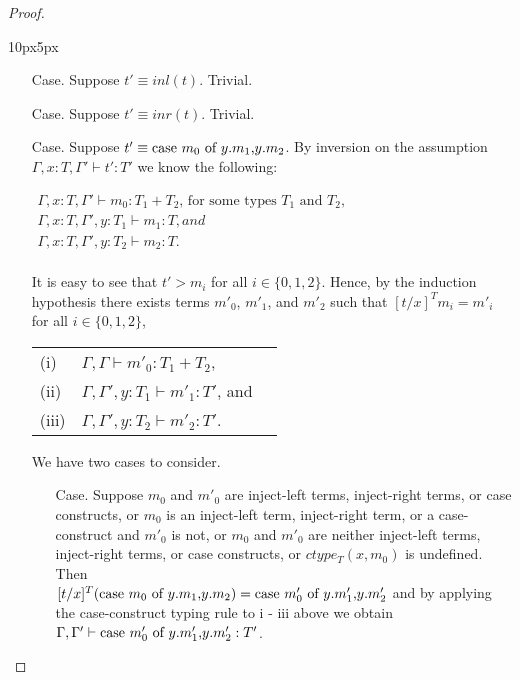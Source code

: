 \begin{proof}
\begin{changemargin}{10px}{5px}
\begin{itemize}
\item[Case.] Suppose $t' \equiv inl(t)$. Trivial.
  
\item[Case.] Suppose $t' \equiv inr(t)$. Trivial.
  
\item[Case.] Suppose $t' \equiv \mbox{case}\ m_0\ \text{of}\ y\text{.}m_1\text{,}y\text{.}m_2$. By inversion on the assumption
  $\Gamma,x:T,\Gamma' \vdash t':T'$ we know the following:
  \begin{center}
    \begin{math}
      \begin{array}{lll}
        \Gamma,x:T,\Gamma' \vdash m_0:T_1+T_2 \text{, for some types } T_1 \text{ and } T_2,\\
        \Gamma,x:T,\Gamma',y:T_1 \vdash m_1:T, and\\
        \Gamma,x:T,\Gamma',y:T_2 \vdash m_2:T.\\
      \end{array}
    \end{math}
  \end{center}
  It is easy to see that
  $t' > m_i$ for all $i \in \{0,1,2\}$.  Hence, by the induction hypothesis
  there exists terms $m'_0$, $m'_1$, and $m'_2$ such that $[t/x]^T m_i = m'_i$ for all $i \in \{0,1,2\}$,
  \begin{center}
    \begin{tabular}{lll}
      (i)   & $\Gamma,\Gamma \vdash m'_0:T_1+T_2$,  \\
      (ii)  & $\Gamma,\Gamma',y:T_1 \vdash m'_1:T'$, and\\
      (iii) & $\Gamma,\Gamma',y:T_2 \vdash m'_2:T'$.  
    \end{tabular}
  \end{center}
  We have two cases to consider.
  \begin{itemize}
  \item[Case.] Suppose $m_0$ and $m'_0$ are inject-left terms, inject-right terms, or case constructs,
    or $m_0$ is an inject-left term, inject-right term, or a case-construct and $m'_0$ is not, or
    $m_0$ and $m'_0$ are neither inject-left terms, inject-right terms, or case constructs, or
    $ctype_T(x,m_0)$ is undefined.
    Then \\
    $[t/x]^{T} (\mbox{case}\ m_0\ \text{of}\ y\text{.}m_1\text{,}y\text{.}m_2) = \mbox{case}\ m'_0\ \text{of}\ y\text{.}m'_1\text{,}y\text{.}m'_2$ and by applying the case-construct 
    typing rule to i - iii above we obtain \\ $\Gamma,\Gamma' \vdash \mbox{case}\ m'_0\ \text{of}\ y\text{.}m'_1\text{,}y\text{.}m'_2:T'$.
    

\end{itemize}
\end{itemize}
\end{changemargin}
\end{proof}
